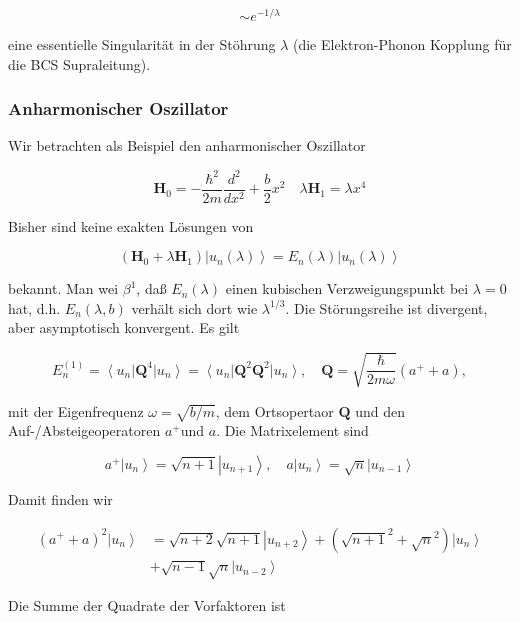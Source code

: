 \documentclass[10pt, letterpaper]{article}
\begin{document}
$$
\sim e^{-1 / \lambda}
$$

eine essentielle Singularität in der Stöhrung $\lambda$ (die Elektron-Phonon Kopplung für die BCS Supraleitung).












\subsubsection*{Anharmonischer Oszillator}
Wir betrachten als Beispiel den anharmonischer Oszillator

$$
\mathbf{H}_{0}=-\frac{\hbar^{2}}{2 m} \frac{d^{2}}{d x^{2}}+\frac{b}{2} x^{2} \quad \lambda \mathbf{H}_{1}=\lambda x^{4}
$$

Bisher sind keine exakten Lösungen von

$$
\left(\mathbf{H}_{0}+\lambda \mathbf{H}_{1}\right)\left|u_{n}(\lambda)\right\rangle=E_{n}(\lambda)\left|u_{n}(\lambda)\right\rangle
$$

bekannt. Man wei $\beta^{1}$, daß $E_{n}(\lambda)$ einen kubischen Verzweigungspunkt bei $\lambda=0$ hat, d.h. $E_{n}(\lambda, b)$ verhält sich dort wie $\lambda^{1 / 3}$. Die Störungsreihe ist divergent, aber asymptotisch konvergent. Es gilt

$$
E_{n}^{(1)}=\left\langle u_{n}\right| \mathbf{Q}^{4}\left|u_{n}\right\rangle=\left\langle u_{n}\right| \mathbf{Q}^{2} \mathbf{Q}^{2}\left|u_{n}\right\rangle, \quad \mathbf{Q}=\sqrt{\frac{\hbar}{2 m \omega}}\left(a^{+}+a\right),
$$

mit der Eigenfrequenz $\omega=\sqrt{b / m}$, dem Ortsopertaor $\mathbf{Q}$ und den Auf-/Absteigeoperatoren $a^{+}$und $a$. Die Matrixelement sind

$$
a^{+}\left|u_{n}\right\rangle=\sqrt{n+1}\left|u_{n+1}\right\rangle, \quad a\left|u_{n}\right\rangle=\sqrt{n}\left|u_{n-1}\right\rangle
$$

Damit finden wir

$$
\begin{aligned}
\left(a^{+}+a\right)^{2}\left|u_{n}\right\rangle & =\sqrt{n+2} \sqrt{n+1}\left|u_{n+2}\right\rangle+\left(\sqrt{n+1}^{2}+\sqrt{n}^{2}\right)\left|u_{n}\right\rangle \\
& +\sqrt{n-1} \sqrt{n}\left|u_{n-2}\right\rangle
\end{aligned}
$$

Die Summe der Quadrate der Vorfaktoren ist
\end{document}
